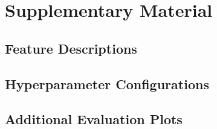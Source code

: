 \chapter{Supplementary Material}
\label{app:supplementary}

\section{Feature Descriptions}
\label{app:features}


\section{Hyperparameter Configurations}
\label{app:hyperparams}


\section{Additional Evaluation Plots}
\label{app:plots}

